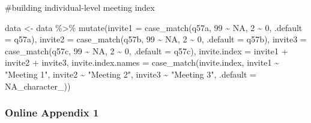 \documentclass[
  letterpaper,
  DIV=11,
  numbers=noendperiod]{scrartcl}
\newenvironment{Shaded}{\begin{snugshade}}{\end{snugshade}}
\newcommand{\AttributeTok}[1]{\textcolor[rgb]{0.40,0.45,0.13}{#1}}
\newcommand{\CommentTok}[1]{\textcolor[rgb]{0.37,0.37,0.37}{#1}}
\newcommand{\ConstantTok}[1]{\textcolor[rgb]{0.56,0.35,0.01}{#1}}
\newcommand{\DecValTok}[1]{\textcolor[rgb]{0.68,0.00,0.00}{#1}}
\newcommand{\FunctionTok}[1]{\textcolor[rgb]{0.28,0.35,0.67}{#1}}
\newcommand{\NormalTok}[1]{\textcolor[rgb]{0.00,0.23,0.31}{#1}}
\newcommand{\OtherTok}[1]{\textcolor[rgb]{0.00,0.23,0.31}{#1}}
\newcommand{\SpecialCharTok}[1]{\textcolor[rgb]{0.37,0.37,0.37}{#1}}
\newcommand{\StringTok}[1]{\textcolor[rgb]{0.13,0.47,0.30}{#1}}
\begin{document}
\begin{Shaded}
\begin{Highlighting}[]
\CommentTok{\#building individual{-}level meeting index}

\NormalTok{data }\OtherTok{\textless{}{-}}\NormalTok{ data }\SpecialCharTok{\%\textgreater{}\%}
  \FunctionTok{mutate}\NormalTok{(}\AttributeTok{invite1 =} \FunctionTok{case\_match}\NormalTok{(q57a, }\DecValTok{99} \SpecialCharTok{\textasciitilde{}} \ConstantTok{NA}\NormalTok{, }\DecValTok{2} \SpecialCharTok{\textasciitilde{}} \DecValTok{0}\NormalTok{, }\AttributeTok{.default =}\NormalTok{ q57a),}
         \AttributeTok{invite2 =} \FunctionTok{case\_match}\NormalTok{(q57b, }\DecValTok{99} \SpecialCharTok{\textasciitilde{}} \ConstantTok{NA}\NormalTok{, }\DecValTok{2} \SpecialCharTok{\textasciitilde{}} \DecValTok{0}\NormalTok{, }\AttributeTok{.default =}\NormalTok{ q57b),}
         \AttributeTok{invite3 =} \FunctionTok{case\_match}\NormalTok{(q57c, }\DecValTok{99} \SpecialCharTok{\textasciitilde{}} \ConstantTok{NA}\NormalTok{, }\DecValTok{2} \SpecialCharTok{\textasciitilde{}} \DecValTok{0}\NormalTok{, }\AttributeTok{.default =}\NormalTok{ q57c),}
         \AttributeTok{invite.index =}\NormalTok{ invite1 }\SpecialCharTok{+}\NormalTok{ invite2 }\SpecialCharTok{+}\NormalTok{ invite3,}
         \AttributeTok{invite.index.names =} \FunctionTok{case\_match}\NormalTok{(invite.index,}
\NormalTok{                                         invite1 }\SpecialCharTok{\textasciitilde{}} \StringTok{"Meeting 1"}\NormalTok{,}
\NormalTok{                                         invite2 }\SpecialCharTok{\textasciitilde{}} \StringTok{"Meeting 2"}\NormalTok{,}
\NormalTok{                                         invite3 }\SpecialCharTok{\textasciitilde{}} \StringTok{"Meeting 3"}\NormalTok{,}
                                         \AttributeTok{.default =} \ConstantTok{NA\_character\_}\NormalTok{))}
\end{Highlighting}
\end{Shaded}

\subsubsection{Online Appendix 1}\label{online-appendix-1}

\begin{Shaded}
\end{Shaded}
\end{document}
